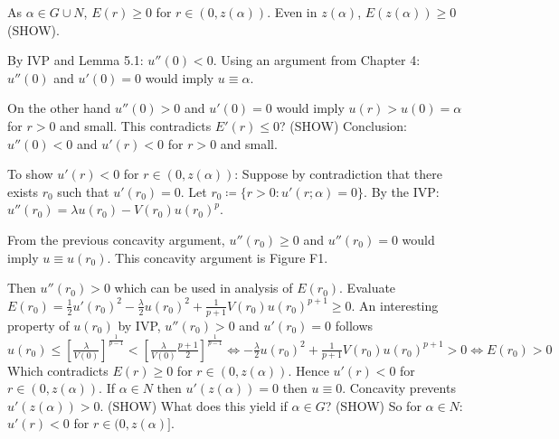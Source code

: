 \documentclass[11pt,a4paper]{amsart}
\theoremstyle{definition}
\numberwithin{equation}{section}
\renewcommand{\leq}{\leqslant}
\renewcommand{\geq}{\geqslant}
\renewcommand{\a}{\alpha}
\begin{document}
\begin{outline}
  \1 As $\alpha\in G\cup N$, $E(r)\geq0$ for $r\in(0,z(\alpha))$.
  \1 Even in $z(\alpha)$, $E(z(\alpha))\geq0$ (SHOW).

  \1 By IVP and Lemma 5.1: $u''(0)<0$.
  \1 Using an argument from Chapter 4: $u''(0)$ and $u'(0)=0$ would imply $u\equiv\alpha$.

  \1 On the other hand $u''(0)>0$ and $u'(0)=0$ would imply $u(r)>u(0)=\alpha$ for $r>0$ and small.
  \1 This contradicts $E'(r)\leq0$? (SHOW)
  \1 Conclusion: $u''(0)<0$ and $u'(r)<0$ for $r>0$ and small.

  \1 To show $u'(r)<0$ for $r\in(0,z(\alpha))$:
    \2 Suppose by contradiction that there exists $r_0$ such that $u'(r_0)=0$.
    \2 Let $r_0\coloneqq\{r>0:u'(r;\a)=0\}$.
    \2 By the IVP: $u''(r_0)=\lambda u(r_0)-V(r_0)u(r_0)^p$.

    \2 From the previous concavity argument, $u''(r_0)\geq0$ and $u''(r_0)=0$ would imply $u\equiv u(r_0)$.
    \2 This concavity argument is Figure F1.

    \2 Then $u''(r_0)>0$ which can be used in analysis of $E(r_0)$.
    \2 Evaluate $E(r_0)=\frac{1}{2}u'(r_0)^2-\frac{\lambda}{2}u(r_0)^2 + \frac{1}{p+1}V(r_0)u(r_0)^{p+1}\geq 0$.
    \2 An interesting property of $u(r_0)$ by IVP, $u''(r_0)>0$ and $u'(r_0)=0$ follows
      \3 $u(r_0)\leq\left[\frac{\lambda}{V(0)}\right]^{\frac{1}{p-1}}<
      \left[\frac{\lambda}{V(0)}\frac{p+1}{2}\right]^{\frac{1}{p-1}} \iff -\frac{\lambda}{2}u(r_0)^2+\frac{1}{p+1}V(r_0)u(r_0)^{p+1}>0 \iff E(r_0)>0$
      \3 Which contradicts $E(r)\geq0$ for $r\in(0,z(\alpha))$.
    \2 Hence $u'(r)<0$ for $r\in(0,z(\alpha))$.
  \1 If $\alpha\in N$ then $u'(z(\alpha))=0$ then $u\equiv0$.
    \2 Concavity prevents $u'(z(\alpha))>0$. (SHOW)
    \2 What does this yield if $\alpha\in G$? (SHOW)
  \1 So for $\alpha\in N$: $u'(r)<0$ for $r\in(0,z(\alpha)]$.
\end{outline}
%
\end{document}
